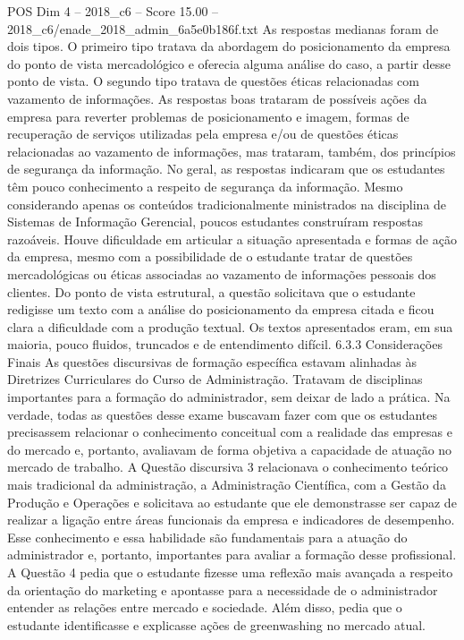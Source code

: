 \begin{textsample}{POS Dim 4 – 2018\_c6 – Score 15.00 – 2018\_c6/enade\_2018\_admin\_6a5e0b186f.txt}
As respostas medianas foram de dois tipos.
O primeiro tipo tratava da abordagem do posicionamento da empresa do ponto de vista mercadológico e oferecia alguma análise do caso, a partir desse ponto de vista.
O segundo tipo tratava de questões éticas relacionadas com vazamento de informações.
As respostas boas trataram de possíveis ações da empresa para reverter problemas de posicionamento e imagem, formas de recuperação de serviços utilizadas pela empresa e/ou de questões éticas relacionadas ao vazamento de informações, mas trataram, também, dos princípios de segurança da informação.
No geral, as respostas indicaram que os estudantes têm pouco conhecimento a respeito de segurança da informação.
Mesmo considerando apenas os conteúdos tradicionalmente ministrados na disciplina de Sistemas de Informação Gerencial, poucos estudantes construíram respostas razoáveis.
Houve dificuldade em articular a situação apresentada e formas de ação da empresa, mesmo com a possibilidade de o estudante tratar de questões mercadológicas ou éticas associadas ao vazamento de informações pessoais dos clientes.
Do ponto de vista estrutural, a questão solicitava que o estudante redigisse um texto com a análise do posicionamento da empresa citada e ficou clara a dificuldade com a produção textual.
Os textos apresentados eram, em sua maioria, pouco fluidos, truncados e de entendimento difícil. 6.3.3 Considerações Finais As questões discursivas de formação específica estavam alinhadas às Diretrizes Curriculares do Curso de Administração.
Tratavam de disciplinas importantes para a formação do administrador, sem deixar de lado a prática.
Na verdade, todas as questões desse exame buscavam fazer com que os estudantes precisassem relacionar o conhecimento conceitual com a realidade das empresas e do mercado e, portanto, avaliavam de forma objetiva a capacidade de atuação no mercado de trabalho.
A Questão discursiva 3 relacionava o conhecimento teórico mais tradicional da administração, a Administração Científica, com a Gestão da Produção e Operações e solicitava ao estudante que ele demonstrasse ser capaz de realizar a ligação entre áreas funcionais da empresa e indicadores de desempenho.
Esse conhecimento e essa habilidade são fundamentais para a atuação do administrador e, portanto, importantes para avaliar a formação desse profissional.
A Questão 4 pedia que o estudante fizesse uma reflexão mais avançada a respeito da orientação do marketing e apontasse para a necessidade de o administrador entender as relações entre mercado e sociedade.
Além disso, pedia que o estudante identificasse e explicasse ações de greenwashing no mercado atual.

\end{textsample}
